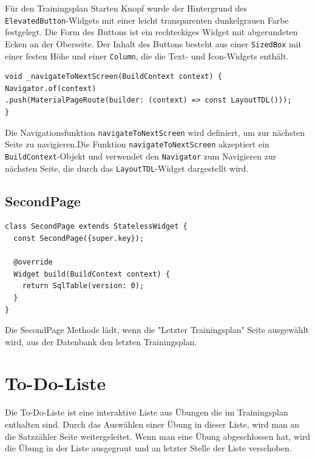Für den Trainingsplan Starten Knopf wurde der Hintergrund des \texttt{ElevatedButton}-Widgets mit einer leicht transparenten dunkelgrauen Farbe festgelegt. Die Form des Buttons ist ein rechteckiges Widget mit abgerundeten Ecken an der Oberseite. Der Inhalt des Buttons besteht aus einer \texttt{SizedBox} mit einer festen Höhe und einer \texttt{Column}, die die Text- und Icon-Widgets enthält.
\\


\begin{lstlisting}[caption=HomePage Navigation,label=lst:impl:frontend:qrcode]
void _navigateToNextScreen(BuildContext context) {
Navigator.of(context)
.push(MaterialPageRoute(builder: (context) => const LayoutTDL()));
}
\end{lstlisting}

Die Navigationsfunktion \texttt{navigateToNextScreen} wird definiert, um zur nächsten Seite zu navigieren.Die Funktion \texttt{navigateToNextScreen} akzeptiert ein \texttt{BuildContext}-Objekt und verwendet den \texttt{Navigator} zum Navigieren zur nächsten Seite, die durch das \texttt{LayoutTDL}-Widget dargestellt wird.

\pagebreak
    \subsection{SecondPage}
    \author{Antonio Kuvac}

    \begin{lstlisting}[caption=Second Page,label=lst:impl:frontend:qrcode]
        class SecondPage extends StatelessWidget {
  const SecondPage({super.key});

  @override
  Widget build(BuildContext context) {
    return SqlTable(version: 0);
  }
}
    \end{lstlisting}

    Die SecondPage Methode lädt, wenn die "Letzter Trainingsplan" Seite ausgewählt wird, aus der Datenbank den letzten Trainingsplan. 

    

    \section{To-Do-Liste}
    \author{Antonio Kuvac}

    Die To-Do-Liste ist eine interaktive Liste aus Übungen die im Trainingsplan enthalten sind. Durch das Auswählen einer Übung in dieser Liste, wird man an die Satzzähler Seite weitergeleitet. Wenn man eine Übung abgeschlossen hat, wird die Übung in der Liste ausgegraut und an letzter Stelle der Liste verschoben.

